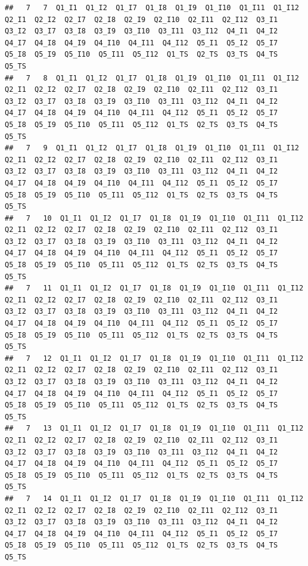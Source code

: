 \documentclass[]{book}
\begin{document}
\begin{verbatim}
##   7   7  Q1_I1  Q1_I2  Q1_I7  Q1_I8  Q1_I9  Q1_I10  Q1_I11  Q1_I12  Q2_I1  Q2_I2  Q2_I7  Q2_I8  Q2_I9  Q2_I10  Q2_I11  Q2_I12  Q3_I1  Q3_I2  Q3_I7  Q3_I8  Q3_I9  Q3_I10  Q3_I11  Q3_I12  Q4_I1  Q4_I2  Q4_I7  Q4_I8  Q4_I9  Q4_I10  Q4_I11  Q4_I12  Q5_I1  Q5_I2  Q5_I7  Q5_I8  Q5_I9  Q5_I10  Q5_I11  Q5_I12  Q1_TS  Q2_TS  Q3_TS  Q4_TS  Q5_TS
##   7   8  Q1_I1  Q1_I2  Q1_I7  Q1_I8  Q1_I9  Q1_I10  Q1_I11  Q1_I12  Q2_I1  Q2_I2  Q2_I7  Q2_I8  Q2_I9  Q2_I10  Q2_I11  Q2_I12  Q3_I1  Q3_I2  Q3_I7  Q3_I8  Q3_I9  Q3_I10  Q3_I11  Q3_I12  Q4_I1  Q4_I2  Q4_I7  Q4_I8  Q4_I9  Q4_I10  Q4_I11  Q4_I12  Q5_I1  Q5_I2  Q5_I7  Q5_I8  Q5_I9  Q5_I10  Q5_I11  Q5_I12  Q1_TS  Q2_TS  Q3_TS  Q4_TS  Q5_TS
##   7   9  Q1_I1  Q1_I2  Q1_I7  Q1_I8  Q1_I9  Q1_I10  Q1_I11  Q1_I12  Q2_I1  Q2_I2  Q2_I7  Q2_I8  Q2_I9  Q2_I10  Q2_I11  Q2_I12  Q3_I1  Q3_I2  Q3_I7  Q3_I8  Q3_I9  Q3_I10  Q3_I11  Q3_I12  Q4_I1  Q4_I2  Q4_I7  Q4_I8  Q4_I9  Q4_I10  Q4_I11  Q4_I12  Q5_I1  Q5_I2  Q5_I7  Q5_I8  Q5_I9  Q5_I10  Q5_I11  Q5_I12  Q1_TS  Q2_TS  Q3_TS  Q4_TS  Q5_TS
##   7   10  Q1_I1  Q1_I2  Q1_I7  Q1_I8  Q1_I9  Q1_I10  Q1_I11  Q1_I12  Q2_I1  Q2_I2  Q2_I7  Q2_I8  Q2_I9  Q2_I10  Q2_I11  Q2_I12  Q3_I1  Q3_I2  Q3_I7  Q3_I8  Q3_I9  Q3_I10  Q3_I11  Q3_I12  Q4_I1  Q4_I2  Q4_I7  Q4_I8  Q4_I9  Q4_I10  Q4_I11  Q4_I12  Q5_I1  Q5_I2  Q5_I7  Q5_I8  Q5_I9  Q5_I10  Q5_I11  Q5_I12  Q1_TS  Q2_TS  Q3_TS  Q4_TS  Q5_TS
##   7   11  Q1_I1  Q1_I2  Q1_I7  Q1_I8  Q1_I9  Q1_I10  Q1_I11  Q1_I12  Q2_I1  Q2_I2  Q2_I7  Q2_I8  Q2_I9  Q2_I10  Q2_I11  Q2_I12  Q3_I1  Q3_I2  Q3_I7  Q3_I8  Q3_I9  Q3_I10  Q3_I11  Q3_I12  Q4_I1  Q4_I2  Q4_I7  Q4_I8  Q4_I9  Q4_I10  Q4_I11  Q4_I12  Q5_I1  Q5_I2  Q5_I7  Q5_I8  Q5_I9  Q5_I10  Q5_I11  Q5_I12  Q1_TS  Q2_TS  Q3_TS  Q4_TS  Q5_TS
##   7   12  Q1_I1  Q1_I2  Q1_I7  Q1_I8  Q1_I9  Q1_I10  Q1_I11  Q1_I12  Q2_I1  Q2_I2  Q2_I7  Q2_I8  Q2_I9  Q2_I10  Q2_I11  Q2_I12  Q3_I1  Q3_I2  Q3_I7  Q3_I8  Q3_I9  Q3_I10  Q3_I11  Q3_I12  Q4_I1  Q4_I2  Q4_I7  Q4_I8  Q4_I9  Q4_I10  Q4_I11  Q4_I12  Q5_I1  Q5_I2  Q5_I7  Q5_I8  Q5_I9  Q5_I10  Q5_I11  Q5_I12  Q1_TS  Q2_TS  Q3_TS  Q4_TS  Q5_TS
##   7   13  Q1_I1  Q1_I2  Q1_I7  Q1_I8  Q1_I9  Q1_I10  Q1_I11  Q1_I12  Q2_I1  Q2_I2  Q2_I7  Q2_I8  Q2_I9  Q2_I10  Q2_I11  Q2_I12  Q3_I1  Q3_I2  Q3_I7  Q3_I8  Q3_I9  Q3_I10  Q3_I11  Q3_I12  Q4_I1  Q4_I2  Q4_I7  Q4_I8  Q4_I9  Q4_I10  Q4_I11  Q4_I12  Q5_I1  Q5_I2  Q5_I7  Q5_I8  Q5_I9  Q5_I10  Q5_I11  Q5_I12  Q1_TS  Q2_TS  Q3_TS  Q4_TS  Q5_TS
##   7   14  Q1_I1  Q1_I2  Q1_I7  Q1_I8  Q1_I9  Q1_I10  Q1_I11  Q1_I12  Q2_I1  Q2_I2  Q2_I7  Q2_I8  Q2_I9  Q2_I10  Q2_I11  Q2_I12  Q3_I1  Q3_I2  Q3_I7  Q3_I8  Q3_I9  Q3_I10  Q3_I11  Q3_I12  Q4_I1  Q4_I2  Q4_I7  Q4_I8  Q4_I9  Q4_I10  Q4_I11  Q4_I12  Q5_I1  Q5_I2  Q5_I7  Q5_I8  Q5_I9  Q5_I10  Q5_I11  Q5_I12  Q1_TS  Q2_TS  Q3_TS  Q4_TS  Q5_TS

\end{verbatim}
\end{document}
